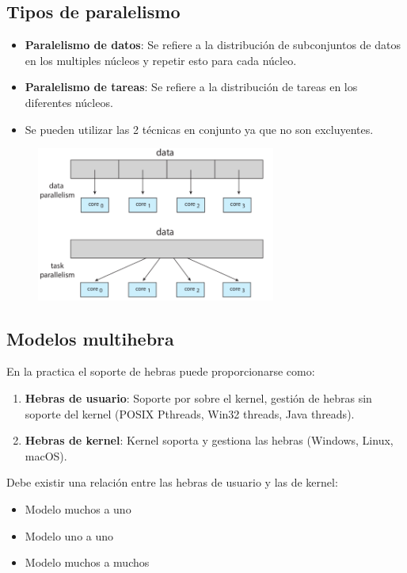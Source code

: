 \documentclass{templateNote}
\begin{document}
\subsection*{Tipos de paralelismo}
\begin{itemize}
    \item \textbf{Paralelismo de datos}: Se refiere a la distribución de subconjuntos de datos en los multiples núcleos y repetir esto para cada núcleo.
    \item \textbf{Paralelismo de tareas}: Se refiere a la distribución de tareas en los diferentes núcleos.
    \item Se pueden utilizar las 2 técnicas en conjunto ya que no son excluyentes.
\end{itemize}

\begin{figure}[H]
    \centering
    \includegraphics[width=0.7\textwidth]{img/paral.png}
\end{figure}


\subsection*{Modelos multihebra}
En la practica el soporte de hebras puede proporcionarse como:
\begin{enumerate}
    \item \textbf{Hebras de usuario}: Soporte por sobre el kernel, gestión de hebras sin soporte del kernel (POSIX Pthreads, Win32 threads, Java threads).
    \item \textbf{Hebras de kernel}: Kernel soporta y gestiona las hebras (Windows, Linux, macOS).
\end{enumerate}

Debe existir una relación entre las hebras de usuario y las de kernel:
\begin{itemize}
    \item Modelo muchos a uno
    \item Modelo uno a uno
    \item Modelo muchos a muchos
\end{itemize}
\end{document}
